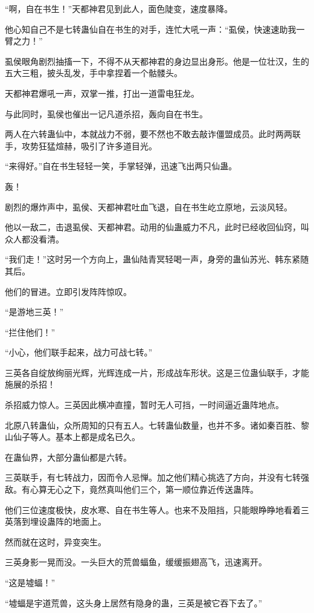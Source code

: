 \begin{this_body}
“啊，自在书生！”天都神君见到此人，面色陡变，速度暴降。

他心知自己不是七转蛊仙自在书生的对手，连忙大吼一声：“虱侯，快速速助我一臂之力！”

虱侯眼角剧烈抽搐一下，不得不从天都神君的身边显出身形。他是一位壮汉，生的五大三粗，披头乱发，手中拿捏着一个骷髅头。

天都神君爆吼一声，双掌一推，打出一道雷电狂龙。

与此同时，虱侯也催出一记凡道杀招，轰向自在书生。

两人在六转蛊仙中，本就战力不弱，要不然也不敢去敲诈僵盟成员。此时两两联手，攻势狂猛煊赫，吸引了许多道目光。

“来得好。”自在书生轻轻一笑，手掌轻弹，迅速飞出两只仙蛊。

轰！

剧烈的爆炸声中，虱侯、天都神君吐血飞退，自在书生屹立原地，云淡风轻。

他以一敌二，击退虱侯、天都神君。动用的仙蛊威力不凡，此时已经收回仙窍，叫众人都没看清。

“我们走！”这时另一个方向上，蛊仙陆青冥轻喝一声，身旁的蛊仙苏光、韩东紧随其后。

他们的冒进。立即引发阵阵惊叹。

“是游地三英！”

“拦住他们！”

“小心，他们联手起来，战力可战七转。”

三英各自绽放绚丽光辉，光辉连成一片，形成战车形状。这是三位蛊仙联手，才能施展的杀招！

杀招威力惊人。三英因此横冲直撞，暂时无人可挡，一时间逼近蛊阵地点。

北原八转蛊仙，众所周知的只有五人。七转蛊仙数量，也并不多。诸如秦百胜、黎山仙子等人。基本上都是成名已久。

在蛊仙界，大部分蛊仙都是六转。

三英联手，有七转战力，因而令人忌惮。加之他们精心挑选了方向，并没有七转强敌。有心算无心之下，竟然真叫他们三个，第一顺位靠近传送蛊阵。

他们三位速度极快，皮水寒、自在书生等人。也来不及阻挡，只能眼睁睁地看着三英落到埋设蛊阵的地面上。

然而就在这时，异变突生。

三英身影一晃而没。一头巨大的荒兽蝠鱼，缓缓振翅高飞，迅速离开。

“这是墟蝠！”

“墟蝠是宇道荒兽，这头身上居然有隐身的蛊，三英是被它吞下去了。”


\end{this_body}
